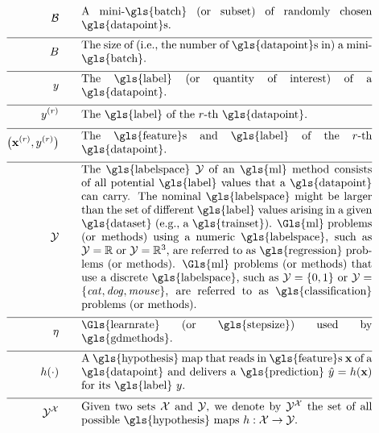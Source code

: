 \begin{align}
	\batch \quad\quad &\parbox{.75\textwidth}{A mini-\gls{batch} (or subset) of randomly chosen \gls{datapoint}s.}\nonumber \\[2mm] \hline \nonumber\\[-5mm]
	\batchsize \quad\quad &\parbox{.75\textwidth}{The size of (i.e., the number of \gls{datapoint}s in) a mini-\gls{batch}.}\nonumber \\[2mm] \hline \nonumber\\[-5mm]
	\truelabel \quad\quad &\parbox{.75\textwidth}{The \gls{label} (or quantity of interest) of a \gls{datapoint}.} \nonumber \\[2mm] \hline \nonumber\\[-5mm]
	\truelabel^{(\sampleidx)} \quad\quad &\parbox{.75\textwidth}{The \gls{label} of the $\sampleidx$-th \gls{datapoint}.} \nonumber \\[2mm] \hline \nonumber\\[-5mm]
	\big(\featurevec^{(\sampleidx)},\truelabel^{(\sampleidx)}\big)  \quad\quad &\parbox{.75\textwidth}{The \gls{feature}s and \gls{label} of the $\sampleidx$-th \gls{datapoint}.}\nonumber \\[2mm] \hline \nonumber\\[-5mm]
	\labelspace  \quad\quad & \parbox{.75\textwidth}{The \gls{labelspace} $\labelspace$ of 
		an \gls{ml} method consists of all potential \gls{label} values that a \gls{datapoint} can 
		carry. The nominal \gls{labelspace} might be larger than the set of different \gls{label} 
		values arising in a given \gls{dataset} (e.g., a \gls{trainset}). \Gls{ml} problems 
		(or methods) using a numeric \gls{labelspace}, such as $\labelspace=\mathbb{R}$ 
		or $\labelspace=\mathbb{R}^{3}$, are referred to as \gls{regression} problems (or methods). \Gls{ml} 
		problems (or methods) that use a discrete \gls{labelspace}, such as $\labelspace=\{0,1\}$ or $\labelspace=\{\mbox{\emph{cat}},\mbox{\emph{dog}},\mbox{\emph{mouse}}\}$, 
		are referred to as \gls{classification} problems (or methods).}  \nonumber \\[2mm] \hline \nonumber\\[-5mm]
	\lrate  \quad\quad & \parbox{.75\textwidth}{\Gls{learnrate} (or \gls{stepsize}) used by \gls{gdmethods}.}  \nonumber \\[2mm] \hline \nonumber\\[-5mm]
	\hypothesis(\cdot)  \quad\quad &\parbox{.75\textwidth}{A \gls{hypothesis} map that reads in \gls{feature}s $\featurevec$ of a \gls{datapoint} 
		and delivers a \gls{prediction} $\hat{\truelabel}=\hypothesis(\featurevec)$ for its \gls{label} $\truelabel$.}  	 \nonumber \\[2mm] \hline \nonumber\\[-5mm]
	 \labelspace^{\featurespace} \quad\quad & \parbox{.75\textwidth}{Given two sets $\featurespace$ and $\labelspace$, we denote by $ \labelspace^{\featurespace}$ the set of all possible \gls{hypothesis} maps $\hypothesis: \featurespace \rightarrow \labelspace$.} 	 \nonumber 
\end{align}                  


